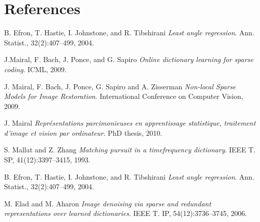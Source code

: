 \documentclass{ipol}
\begin{document}
\section{References}

\begin{thebibliography}{9}

	B. Efron, T. Hastie, I. Johnstone, and R. Tibshirani
	\emph{Least angle regression}. 
	Ann. Statist.,
	32(2):407–499,
	2004.

	J.Mairal, F. Bach, J. Ponce, and G. Sapiro
	\emph{Online dictionary learning for sparse coding}.
	ICML,
	2009.

	J. Mairal, F. Bach, J. Ponce, G. Sapiro and A. Zisserman
	\emph{ Non-local Sparse Models for Image Restoration}.
	International Conference on Computer Vision,
	2009.

	J. Mairal
	\emph{ Représentations parcimonieuses en apprentissage statistique, traitement d’image et
vision par ordinateur}.
	PhD thesis,
	2010.

	S. Mallat and Z. Zhang
 	\emph{Matching pursuit in a timefrequency dictionary}.
	IEEE T. SP,
	41(12):3397–3415,
	1993.

	B. Efron, T. Hastie, I. Johnstone, and R. Tibshirani
	\emph{ Least angle regression}.
	Ann. Statist.,
	32(2):407–499,
	2004.

	M. Elad and M. Aharon
	\emph{Image denoising via sparse and redundant representations over learned dictionaries}.
	IEEE T.
	IP, 54(12):3736–3745,
	2006.

\end{thebibliography}
\end{document}
